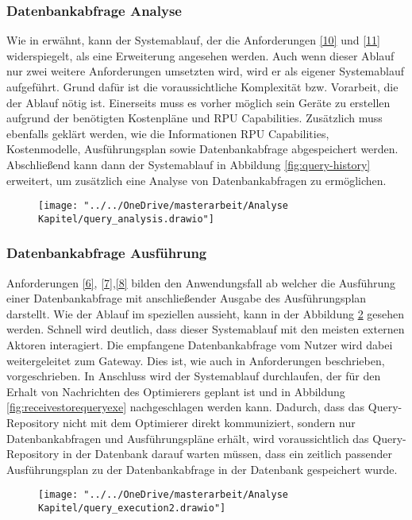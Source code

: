 \newpage
\subsubsection{Datenbankabfrage Analyse} \label{Datenbankabfrage_Analyse}
Wie in  erwähnt, kann der Systemablauf, der die Anforderungen \ref{10} und \ref{11} widerspiegelt, als eine Erweiterung angesehen werden.
Auch wenn dieser Ablauf nur zwei weitere Anforderungen umsetzten wird, wird er als eigener Systemablauf aufgeführt.
Grund dafür ist die voraussichtliche Komplexität bzw. Vorarbeit, die der Ablauf nötig ist. 
Einerseits muss es vorher möglich sein Geräte zu erstellen aufgrund der benötigten Kostenpläne und RPU Capabilities. 
Zusätzlich muss ebenfalls geklärt werden, wie die Informationen RPU Capabilities, Kostenmodelle, Ausführungsplan sowie Datenbankabfrage abgespeichert werden.
Abschließend kann dann der Systemablauf in Abbildung \ref{fig:query-history} erweitert, um zusätzlich eine Analyse von Datenbankabfragen zu ermöglichen. 

\begin{figure}[h!]
	\centering
	\texttt{[image: "../../OneDrive/masterarbeit/Analyse Kapitel/query\_analysis.drawio"]}
	\caption{}
	\label{fig:queryanalysis}
\end{figure}
\newpage



\subsubsection{Datenbankabfrage Ausführung}
Anforderungen \ref{6}, \ref{7},\ref{8} bilden den Anwendungsfall ab welcher die Ausführung einer Datenbankabfrage mit anschließender Ausgabe des Ausführungsplan darstellt. Wie der Ablauf im speziellen aussieht, kann in der Abbildung \ref{fig:queryexecution2} gesehen werden. Schnell wird deutlich, dass dieser Systemablauf mit den meisten externen Aktoren interagiert. Die empfangene Datenbankabfrage vom Nutzer wird dabei weitergeleitet zum Gateway. Dies ist, wie auch in Anforderungen beschrieben, vorgeschrieben.
In Anschluss wird der Systemablauf durchlaufen, der für den Erhalt von Nachrichten des Optimierers geplant ist und in Abbildung \ref{fig:receivestorequeryexe} nachgeschlagen werden kann. 
Dadurch, dass das Query-Repository nicht mit dem Optimierer direkt kommuniziert, sondern nur Datenbankabfragen und Ausführungspläne erhält, wird voraussichtlich das Query-Repository in der Datenbank darauf warten müssen, dass ein zeitlich passender Ausführungsplan zu der Datenbankabfrage in der Datenbank gespeichert wurde.
\begin{figure}[h!]
	\centering
	\texttt{[image: "../../OneDrive/masterarbeit/Analyse Kapitel/query\_execution2.drawio"]}
	\caption{}
	\label{fig:queryexecution2}
\end{figure}

